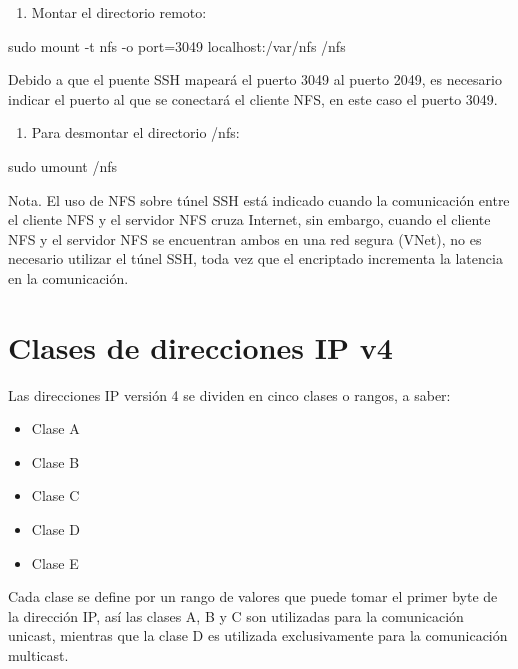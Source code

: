 \begin{enumerate}
\item Montar el directorio remoto:
\end{enumerate}

\begin{SourceCode}
sudo mount -t nfs -o port=3049 localhost:/var/nfs /nfs
\end{SourceCode}

Debido a que el puente SSH mapeará el puerto 3049 al puerto 2049, es necesario indicar el puerto al que se conectará el cliente NFS, en este caso el puerto 3049.

\begin{enumerate}
\item Para desmontar el directorio /nfs:
\end{enumerate}

\begin{SourceCode}
sudo umount /nfs
\end{SourceCode}

Nota. El uso de NFS sobre túnel SSH está indicado cuando la comunicación entre el cliente NFS y el servidor NFS cruza Internet, sin embargo, cuando el cliente NFS y el servidor NFS se encuentran ambos en una red segura (VNet), no es necesario utilizar el túnel SSH, toda vez que el encriptado incrementa la latencia en la comunicación.

\clearpage


\chapter{Clases de direcciones IP v4}

Las direcciones IP versión 4 se dividen en cinco clases o rangos, a saber:

\begin{itemize}
\item Clase A
\item Clase B
\item Clase C
\item Clase D
\item Clase E
\end{itemize}

Cada clase se define por un rango de valores que puede tomar el primer byte de la dirección IP, así las clases A, B y C son utilizadas para la comunicación unicast, mientras que la clase D es utilizada exclusivamente para la comunicación multicast.

